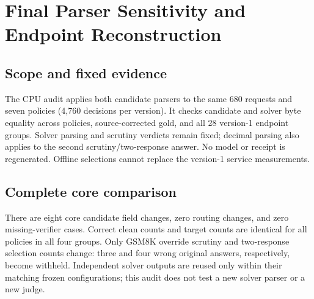 \documentclass[journal,onecolumn]{IEEEtran}
\begin{document}
\clearpage
\section{Final Parser Sensitivity and Endpoint Reconstruction}
\label{sec:s23}
\subsection{Scope and fixed evidence}
The CPU audit applies both candidate parsers to the same 680 requests and seven policies (4,760 decisions per version). It checks candidate and solver byte equality across policies, source-corrected gold, and all 28 version-1 endpoint groups. Solver parsing and scrutiny verdicts remain fixed; decimal parsing also applies to the second scrutiny/two-response answer. No model or receipt is regenerated. Offline selections cannot replace the version-1 service measurements.

\subsection{Complete core comparison}
There are eight core candidate field changes, zero routing changes, and zero missing-verifier cases. Correct clean counts and target counts are identical for all policies in all four groups. Only GSM8K override scrutiny and two-response selection counts change: three and four wrong original answers, respectively, become withheld. Independent solver outputs are reused only within their matching frozen configurations; this audit does not test a new solver parser or a new judge.
\end{document}
